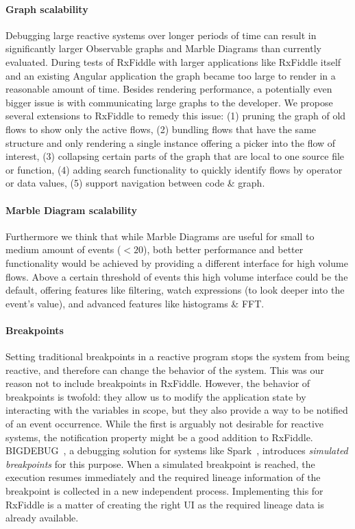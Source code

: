 \paragraph{Graph scalability}
Debugging large reactive systems over longer periods of time can result in significantly larger Observable graphs and Marble Diagrams than currently evaluated. During tests of RxFiddle with larger applications like RxFiddle itself and an existing Angular application the graph became too large to render in a reasonable amount of time. Besides rendering performance, a potentially even bigger issue is with communicating large graphs to the developer. We propose several extensions to RxFiddle to remedy this issue: (1) pruning the graph of old flows to show only the active flows, (2) bundling flows that have the same structure and only rendering a single instance offering a picker into the flow of interest, (3) collapsing certain parts of the graph that are local to one source file or function, (4) adding search functionality to quickly identify flows by operator or data values, (5) support navigation between code \& graph.

\paragraph{Marble Diagram scalability}
Furthermore we think that while Marble Diagrams are useful for small to medium amount of events ($< 20$), both better performance and better functionality would be achieved by providing a different interface for high volume flows. Above a certain threshold of events this high volume interface could be the default, offering features like filtering, watch expressions (to look deeper into the event's value), and advanced features like histograms \& FFT.

\paragraph{Breakpoints}
\label{breakpoints}
Setting traditional breakpoints in a reactive program stops the system from being reactive, and therefore can change the behavior of the system. This was our reason not to include breakpoints in RxFiddle. However, the behavior of breakpoints is twofold: they allow us to modify the application state by interacting with the variables in scope, but they also provide a way to be notified of an event occurrence. While the first is arguably not desirable for reactive systems, the notification property might be a good addition to RxFiddle. BIGDEBUG~\cite{Gulzar2016}, a debugging solution for systems like Spark~\cite{zaharia2012resilient}, introduces \textit{simulated breakpoints} for this purpose. When a simulated breakpoint is reached, the execution resumes immediately and the required lineage information of the breakpoint is collected in a new independent process. Implementing this for RxFiddle is a matter of creating the right UI as the required lineage data is already available.
